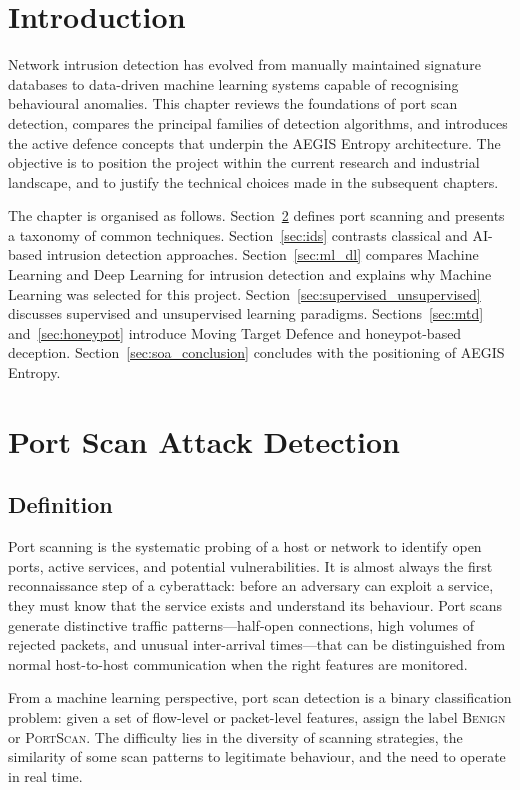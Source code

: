 \documentclass[12pt,a4paper]{report}
\begin{document}
\section{Introduction}

Network intrusion detection has evolved from manually maintained signature databases to data-driven machine learning systems capable of recognising behavioural anomalies. This chapter reviews the foundations of port scan detection, compares the principal families of detection algorithms, and introduces the active defence concepts that underpin the AEGIS Entropy architecture. The objective is to position the project within the current research and industrial landscape, and to justify the technical choices made in the subsequent chapters.

The chapter is organised as follows. Section~\ref{sec:portscan} defines port scanning and presents a taxonomy of common techniques. Section~\ref{sec:ids} contrasts classical and AI-based intrusion detection approaches. Section~\ref{sec:ml_dl} compares Machine Learning and Deep Learning for intrusion detection and explains why Machine Learning was selected for this project. Section~\ref{sec:supervised_unsupervised} discusses supervised and unsupervised learning paradigms. Sections~\ref{sec:mtd} and~\ref{sec:honeypot} introduce Moving Target Defence and honeypot-based deception. Section~\ref{sec:soa_conclusion} concludes with the positioning of AEGIS Entropy.

\section{Port Scan Attack Detection}\label{sec:portscan}

\subsection{Definition}

Port scanning is the systematic probing of a host or network to identify open ports, active services, and potential vulnerabilities. It is almost always the first reconnaissance step of a cyberattack: before an adversary can exploit a service, they must know that the service exists and understand its behaviour. Port scans generate distinctive traffic patterns---half-open connections, high volumes of rejected packets, and unusual inter-arrival times---that can be distinguished from normal host-to-host communication when the right features are monitored.

From a machine learning perspective, port scan detection is a binary classification problem: given a set of flow-level or packet-level features, assign the label \textsc{Benign} or \textsc{PortScan}. The difficulty lies in the diversity of scanning strategies, the similarity of some scan patterns to legitimate behaviour, and the need to operate in real time.
\end{document}
